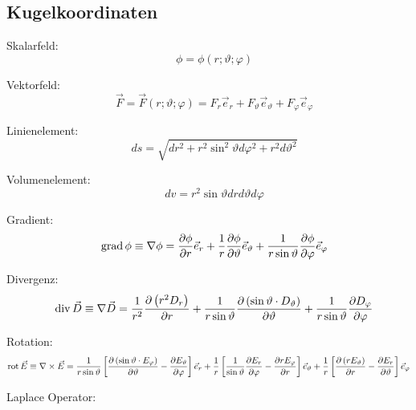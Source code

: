 \subsection{Kugelkoordinaten}
\begin{description}
      \item Skalarfeld:
            \[
                  \quad \phi = \phi(r; \vartheta; \varphi)
            \]
      \item Vektorfeld:
            \[
                  \quad \vec{F} = \vec{F}(r;\vartheta;\varphi) = F_r\vec{e}_r+F_\vartheta\vec{e}_\vartheta+F_\varphi\vec{e}_\varphi
            \]
      \item Linienelement:
            \[
                  \quad d s=\sqrt{d r^{2}+r^{2} \sin ^{2} \vartheta d \varphi^{2}+r^{2} d \vartheta^{2}}
            \]
      \item Volumenelement:
            \[
                  \quad d v=r^{2} \sin \vartheta d r d \vartheta d \varphi
            \]
      \item Gradient:
            \[
                  \quad \operatorname{grad} \phi \equiv \nabla \phi=\frac{\partial \phi}{\partial r} \vec{e}_r+\frac{1}{r} \frac{\partial \phi}{\partial \vartheta} \vec{e}_\vartheta+\frac{1}{r \sin \vartheta} \frac{\partial \phi}{\partial \varphi} \vec{e}_\varphi
            \]
      \item Divergenz:
            \[
                  \quad \operatorname{div} \vec{D} \equiv \nabla \vec{D}=\frac{1}{r^{2}} \frac{\partial\left(r^{2} D_{r}\right)}{\partial r}+\frac{1}{r \sin \vartheta} \frac{\partial\left(\sin \vartheta \cdot D_{\vartheta}\right)}{\partial \vartheta}+\frac{1}{r \sin \vartheta} \frac{\partial D_{\varphi}}{\partial \varphi}
            \]
      \item Rotation:
            \[
                  \operatorname{rot} \vec{E}  \equiv \nabla \times \vec{E}= \frac{1}{r \sin \vartheta}\left[\frac{\partial\left(\sin \vartheta \cdot E_\varphi\right)}{\partial \vartheta}-\frac{\partial E_\vartheta}{\partial \varphi}\right] \vec{e}_r                                                                                 \\
                  +                           \frac{1}{r}\left[\frac{1}{\sin \vartheta} \frac{\partial E_r}{\partial \varphi}-\frac{\partial r E_\varphi}{\partial r}\right] \vec{e}_\vartheta+\frac{1}{r}\left[\frac{\partial\left(r E_\vartheta\right)}{\partial r}-\frac{\partial E_r}{\partial \vartheta}\right] \vec{e}_\varphi
            \]
      \item Laplace Operator:

\end{description}
